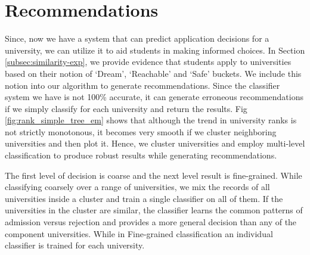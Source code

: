 \documentclass{sig-alternate-05-2015}
\begin{document}
\section{Recommendations}
\label{sec:recommendations}
Since, now we have a system that can predict application decisions for a university, we can utilize it to aid students in making informed choices. In Section \ref{subsec:similarity-exp}, we provide evidence that students apply to universities based on their notion of `Dream', `Reachable' and `Safe' buckets. We include this notion into our algorithm to generate recommendations. Since the classifier system we have is not 100\% accurate, it can generate erroneous recommendations if we simply classify for each university and return the results. Fig \ref{fig:rank_simple_tree_em} shows that although the trend in university ranks is not strictly monotonous, it becomes very smooth if we cluster neighboring universities and then plot it. Hence, we cluster universities and employ multi-level classification to produce robust results while generating recommendations.

The first level of decision is coarse and the next level result is fine-grained. While classifying coarsely over a range of universities, we mix the records of all universities inside a cluster and train a single classifier on all of them. If the universities in the cluster are similar, the classifier learns the common patterns of admission versus rejection and provides a more general decision than any of the component universities. While in Fine-grained classification an individual classifier is trained for each university.
\end{document}
